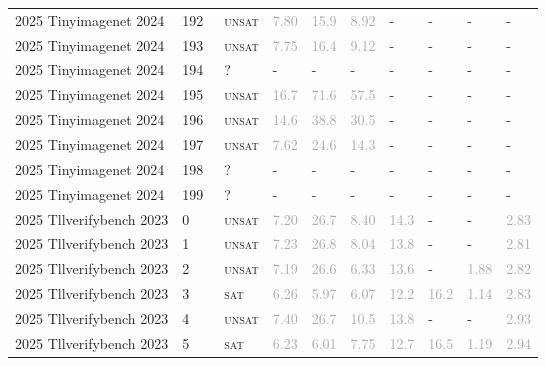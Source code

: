 \begin{center}
{\begin{longtable}{@{}llllllllll@{}}
2025 Tinyimagenet 2024 & 192 & ~\textsc{unsat} & \textcolor{darkgray}{7.80} & \textcolor{darkgray}{15.9} & \textcolor{darkgray}{8.92} & - & - & - & - \\
2025 Tinyimagenet 2024 & 193 & ~\textsc{unsat} & \textcolor{darkgray}{7.75} & \textcolor{darkgray}{16.4} & \textcolor{darkgray}{9.12} & - & - & - & - \\
2025 Tinyimagenet 2024 & 194 & ~? & - & - & - & - & - & - & - \\
2025 Tinyimagenet 2024 & 195 & ~\textsc{unsat} & \textcolor{darkgray}{16.7} & \textcolor{darkgray}{71.6} & \textcolor{darkgray}{57.5} & - & - & - & - \\
2025 Tinyimagenet 2024 & 196 & ~\textsc{unsat} & \textcolor{darkgray}{14.6} & \textcolor{darkgray}{38.8} & \textcolor{darkgray}{30.5} & - & - & - & - \\
2025 Tinyimagenet 2024 & 197 & ~\textsc{unsat} & \textcolor{darkgray}{7.62} & \textcolor{darkgray}{24.6} & \textcolor{darkgray}{14.3} & - & - & - & - \\
2025 Tinyimagenet 2024 & 198 & ~? & - & - & - & - & - & - & - \\
2025 Tinyimagenet 2024 & 199 & ~? & - & - & - & - & - & - & - \\
\midrule
2025 Tllverifybench 2023 & 0 & ~\textsc{unsat} & \textcolor{darkgray}{7.20} & \textcolor{darkgray}{26.7} & \textcolor{darkgray}{8.40} & \textcolor{darkgray}{14.3} & - & - & \textcolor{darkgray}{2.83} \\
2025 Tllverifybench 2023 & 1 & ~\textsc{unsat} & \textcolor{darkgray}{7.23} & \textcolor{darkgray}{26.8} & \textcolor{darkgray}{8.04} & \textcolor{darkgray}{13.8} & - & - & \textcolor{darkgray}{2.81} \\
2025 Tllverifybench 2023 & 2 & ~\textsc{unsat} & \textcolor{darkgray}{7.19} & \textcolor{darkgray}{26.6} & \textcolor{darkgray}{6.33} & \textcolor{darkgray}{13.6} & - & \textcolor{darkgray}{1.88} & \textcolor{darkgray}{2.82} \\
2025 Tllverifybench 2023 & 3 & ~\textsc{sat} & \textcolor{darkgray}{6.26} & \textcolor{darkgray}{5.97} & \textcolor{darkgray}{6.07} & \textcolor{darkgray}{12.2} & \textcolor{darkgray}{16.2} & \textcolor{darkgray}{1.14} & \textcolor{darkgray}{2.83} \\
2025 Tllverifybench 2023 & 4 & ~\textsc{unsat} & \textcolor{darkgray}{7.40} & \textcolor{darkgray}{26.7} & \textcolor{darkgray}{10.5} & \textcolor{darkgray}{13.8} & - & - & \textcolor{darkgray}{2.93} \\
2025 Tllverifybench 2023 & 5 & ~\textsc{sat} & \textcolor{darkgray}{6.23} & \textcolor{darkgray}{6.01} & \textcolor{darkgray}{7.75} & \textcolor{darkgray}{12.7} & \textcolor{darkgray}{16.5} & \textcolor{darkgray}{1.19} & \textcolor{darkgray}{2.94} \\

\end{longtable}}
\end{center}
